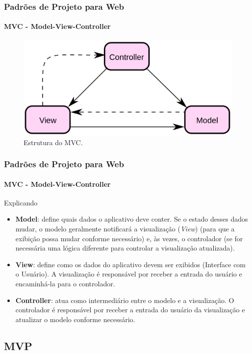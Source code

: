 \documentclass[
	9pt, %
	t, %
]{beamer}
\begin{document}
\begin{frame}
	\frametitle{Padrões de Projeto para Web}
	\framesubtitle{MVC - Model-View-Controller}

	\begin{figure}
		\centering
		\includegraphics[width=0.9\linewidth]{Images/mvc.png}
		\caption{Estrutura do MVC.}\label{fig:mvc}
	\end{figure}

\end{frame}

\begin{frame}
	\frametitle{Padrões de Projeto para Web}
	\framesubtitle{MVC - Model-View-Controller}

	\begin{block}{Explicando}
		\begin{itemize}
			\item \textbf{Model}: define quais dados o aplicativo deve conter. Se o estado desses dados mudar, o modelo geralmente notificará a visualização (\textit{View}) (para que a exibição possa mudar conforme necessário) e, às vezes, o controlador (se for necessária uma lógica diferente para controlar a visualização atualizada).
			\item \textbf{View}: define como os dados do aplicativo devem ser exibidos (Interface com o Usuário). A visualização é responsável por receber a entrada do usuário e encaminhá-la para o controlador.
			\item \textbf{Controller}: atua como intermediário entre o modelo e a visualização. O controlador é responsável por receber a entrada do usuário da visualização e atualizar o modelo conforme necessário. 
		\end{itemize}
	\end{block}

\end{frame}



\subsection{MVP}
\end{document}
